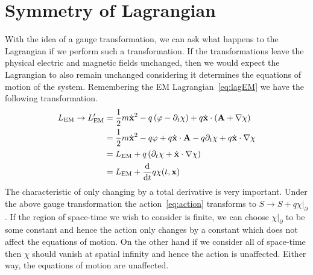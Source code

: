 \section{Symmetry of Lagrangian}
With the idea of a gauge transformation, we can ask what happens to the
Lagrangian if we perform such a transformation. If the transformations leave the
physical electric and magnetic fields unchanged, then we would expect the
Lagrangian to also remain unchanged considering it determines the equations of
motion of the system. Remembering the EM Lagrangian~\ref{eq:lagEM} we have the
following transformation.
\begin{align*}
    L_\text{EM}\to L_\text{EM}' & = \frac{1}{2}m\dot{\mathbf{x}}^2 - q\left(\varphi - \partial_t\chi\right) + q\dot{\mathbf{x}}\cdot\left(\mathbf{A} + \nabla\chi\right) \\
                                & = \frac{1}{2}m\dot{\mathbf{x}}^2 - q\varphi + q\dot{\mathbf{x}}\cdot\mathbf{A} - q\partial_t\chi + q\dot{\mathbf{x}}\cdot\nabla\chi    \\
                                & = L_\text{EM} + q\left(\partial_t\chi + \dot{\mathbf{x}}\cdot\nabla\chi\right)                                                         \\
                                & = L_\text{EM} + \dv{t}q\chi(t,\mathbf{x})
\end{align*}
The characteristic of only changing by a total derivative is very important.
Under the above gauge transformation the action~\ref{eq:action} transforms to
\(S\to S + q\chi|_\partial\). If the region of space-time we wish to consider is
finite, we can choose \(\chi|_\partial\) to be some constant and hence the action
only changes by a constant which does not affect the equations of motion. On the
other hand if we consider all of space-time then \(\chi\) should vanish at
spatial infinity and hence the action is unaffected. Either way, the equations
of motion are unaffected.

